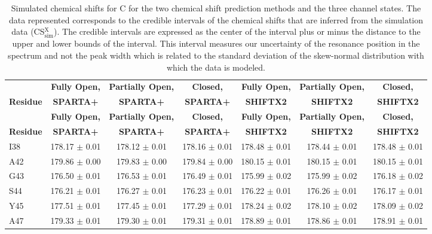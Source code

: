 \documentclass[%
 aip,
 amsmath,amssymb,
 preprint,%
]{revtex4-1}
\begin{document}
\begingroup
\begin{center}
\begin{longtable}{l|c|c|c|c|c|c}
\caption{\scriptsize Simulated chemical shifts for C for the two chemical shift prediction methods and the three channel states. The data represented corresponds to the credible intervals of the chemical shifts that are inferred from the simulation data (CS$_\text{sim}^\text{X}$). The credible intervals are expressed as the center of the interval plus or minus the distance to the upper and lower bounds of the interval. This interval measures our uncertainty of the resonance position in the spectrum and not the peak width which is related to the standard deviation of the skew-normal distribution with which the data is modeled. \label{SI_tb_CSsim_C}}\\ 
\hline 
\hline 
& \textbf{Fully Open,} & \textbf{Partially Open,} & \textbf{Closed,} & \textbf{Fully Open,} & \textbf{Partially Open,} & \textbf{Closed,}  \\
\textbf{Residue} & \textbf{SPARTA+} & \textbf{SPARTA+} & \textbf{SPARTA+} & \textbf{SHIFTX2} & \textbf{SHIFTX2} & \textbf{SHIFTX2}  \\
\hline
\endfirsthead 
\hline
& \textbf{Fully Open,} & \textbf{Partially Open,} & \textbf{Closed,} & \textbf{Fully Open,} & \textbf{Partially Open,} & \textbf{Closed,}  \\
\textbf{Residue} & \textbf{SPARTA+} & \textbf{SPARTA+} & \textbf{SPARTA+} & \textbf{SHIFTX2} & \textbf{SHIFTX2} & \textbf{SHIFTX2}  \\ \hline
\endhead
I38 & 178.17 $\pm$ 0.01 & 178.12 $\pm$ 0.01 & 178.16 $\pm$ 0.01 & 178.48 $\pm$ 0.01 & 178.44 $\pm$ 0.01 & 178.48 $\pm$ 0.01 \\
A42 & 179.86 $\pm$ 0.00 & 179.83 $\pm$ 0.00 & 179.84 $\pm$ 0.00 & 180.15 $\pm$ 0.01 & 180.15 $\pm$ 0.01 & 180.15 $\pm$ 0.01 \\
G43 & 176.50 $\pm$ 0.01 & 176.53 $\pm$ 0.01 & 176.49 $\pm$ 0.01 & 175.99 $\pm$ 0.02 & 175.99 $\pm$ 0.02 & 176.18 $\pm$ 0.02 \\
S44 & 176.21 $\pm$ 0.01 & 176.27 $\pm$ 0.01 & 176.23 $\pm$ 0.01 & 176.22 $\pm$ 0.01 & 176.26 $\pm$ 0.01 & 176.17 $\pm$ 0.01 \\
Y45 & 177.51 $\pm$ 0.01 & 177.45 $\pm$ 0.01 & 177.29 $\pm$ 0.01 & 178.24 $\pm$ 0.02 & 178.10 $\pm$ 0.02 & 178.09 $\pm$ 0.02 \\
A47 & 179.33 $\pm$ 0.01 & 179.30 $\pm$ 0.01 & 179.31 $\pm$ 0.01 & 178.89 $\pm$ 0.01 & 178.86 $\pm$ 0.01 & 178.91 $\pm$ 0.01 \\

\end{longtable}
\end{center}
\end{document}
